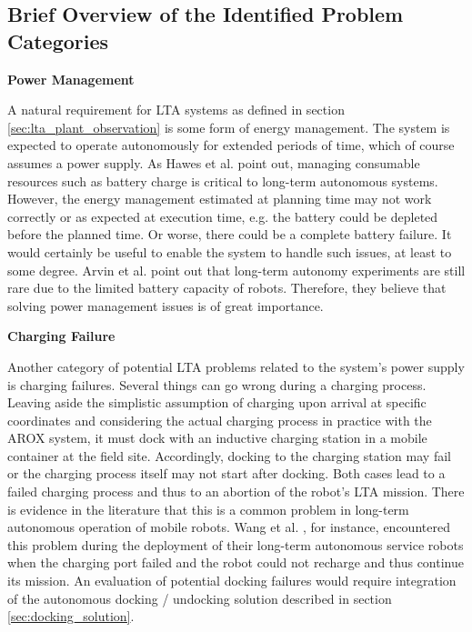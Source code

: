 \documentclass[english, master, utf8]{base/thesis_KBS}
\begin{document}
\subsection{Brief Overview of the Identified Problem Categories}

\noindent
\textbf{Power Management}\newline

\noindent
A natural requirement for LTA systems as defined in section \ref{sec:lta_plant_observation} is some form of energy management.
The system is expected to operate autonomously for extended periods of time, which of course assumes a power supply. 
As Hawes et al. \cite{Hawes:2017} point out, managing consumable resources such as battery charge is critical to long-term autonomous systems.
However, the energy management estimated at planning time may not work correctly or as expected at execution time, e.g. the battery could be 
depleted before the planned time. Or worse, there could be a complete battery failure. It would certainly be useful to enable the system to handle such issues, at least to 
some degree. Arvin et al. point out that long-term autonomy experiments are still rare due to the limited battery capacity of robots. \cite{Arvin:2018}
Therefore, they believe that solving power management issues is of great importance.\newline

\noindent
\textbf{Charging Failure}\newline

\noindent
Another category of potential LTA problems related to the system's power supply is charging failures. Several things can go wrong during a charging process. 
Leaving aside the simplistic assumption of charging upon arrival at specific coordinates and considering the actual charging process 
in practice with the AROX system, it must dock with an inductive charging station in a mobile container at the field site.
Accordingly, docking to the charging station may fail or the charging process itself may not start after docking.
Both cases lead to a failed charging process and thus to an abortion of the robot's LTA mission.
There is evidence in the literature that this is a common problem in long-term autonomous operation of mobile robots. Wang et al. \cite{Wang:2018}, for instance, encountered
this problem during the deployment of their long-term autonomous service robots when the charging port failed and the robot could not recharge and thus continue its mission.
An evaluation of potential docking failures would require integration of the autonomous docking / undocking solution described in section \ref{sec:docking_solution}.\newline
\end{document}
